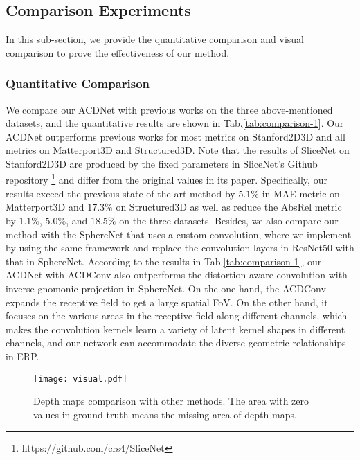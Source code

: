 \documentclass[letterpaper]{article} \usepackage{aaai21}  \usepackage{times}  \usepackage{helvet} \usepackage{courier}  \usepackage[hyphens]{url}  \usepackage{graphicx} \urlstyle{rm} \def\UrlFont{\rm}  \usepackage{natbib}  \usepackage{caption} \frenchspacing  \setlength{\pdfpagewidth}{8.5in}  \setlength{\pdfpageheight}{11in}
\newcommand{\newchange}[1]{{\color{black}#1}}
\begin{document}
\subsection{Comparison Experiments}

In this sub-section, we provide the quantitative comparison and visual comparison to prove the effectiveness of our method.


\subsubsection{Quantitative Comparison}

\newchange{
We compare our ACDNet with previous works on the three above-mentioned datasets, and the quantitative results are shown in Tab.\ref{tab:comparison-1}. Our ACDNet outperforms previous works for most metrics on Stanford2D3D and all metrics on Matterport3D and Structured3D. Note that the results of SliceNet on Stanford2D3D are produced by the fixed parameters in SliceNet's Github repository \footnote{https://github.com/crs4/SliceNet} and differ from the original values in its paper. Specifically, our results exceed the previous state-of-the-art method by $5.1\%$ in MAE metric on Matterport3D and $17.3\%$ on Structured3D as well as reduce the AbsRel metric by $1.1\%$, $5.0\%$, and $18.5\%$ on the three datasets. Besides, we also compare our method with the SphereNet that uses a custom convolution, where we implement by using the same framework and replace the convolution layers in ResNet50 with that in SphereNet. According to the results in Tab.\ref{tab:comparison-1}, our ACDNet with ACDConv also outperforms the distortion-aware convolution with inverse gnomonic projection in SphereNet. On the one hand, the ACDConv expands the receptive field to get a large spatial FoV. On the other hand, it focuses on the various areas in the receptive field along different channels, which makes the convolution kernels learn a variety of latent kernel shapes in different channels, and our network can accommodate the diverse geometric relationships in ERP.
}



\begin{figure*}[tb]
\centering
  \texttt{[image: visual.pdf]}
  \caption{Depth maps comparison with other methods. The area with zero values in ground truth means the missing area of depth maps.}
  \label{fig:visual}
\end{figure*}
\end{document}
